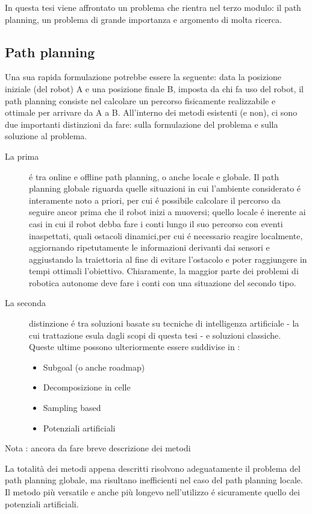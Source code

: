 \documentclass[14pt,twoside,a4paper]{extarticle}
\begin{document}
In questa tesi viene affrontato un problema che rientra nel terzo modulo: il path planning, un problema di grande importanza e argomento di molta ricerca.

\subsection{Path planning}

Una sua rapida formulazione potrebbe essere la seguente: data la posizione iniziale (del robot) A e una posizione finale B, imposta da chi fa uso del robot, il path planning consiste nel calcolare un percorso fisicamente realizzabile e ottimale per arrivare da A a B.
All'interno dei metodi esistenti (e non), ci sono due importanti distinzioni da fare: sulla formulazione del problema e sulla soluzione al problema.
\begin{description}
\item[La prima] é tra online e offline path planning, o anche locale e globale. Il path planning globale riguarda quelle situazioni in cui l'ambiente considerato é interamente noto a priori, per cui é possibile calcolare il percorso da seguire ancor prima che il robot inizi a muoversi; quello locale é inerente ai casi in cui il robot debba fare i conti lungo il suo percorso con eventi inaspettati, quali ostacoli dinamici,per cui é necessario reagire localmente, aggiornando ripetutamente le informazioni derivanti dai sensori e aggiustando la traiettoria al fine di evitare l'ostacolo e poter raggiungere in tempi ottimali l'obiettivo. Chiaramente, la maggior parte dei problemi di robotica autonome deve fare i conti con una situazione del secondo tipo. 
\item[La seconda] distinzione é tra soluzioni basate su tecniche di intelligenza artificiale - la cui trattazione esula dagli scopi di questa tesi - e soluzioni classiche. Queste ultime possono ulteriormente essere suddivise in \cite{siciliano}:
\begin{itemize}
\item{Subgoal (o anche roadmap)}
\item{Decomposizione in celle}
\item{Sampling based}
\item{Potenziali artificiali}
\end{itemize}
\end{description}

Nota : ancora da fare breve descrizione dei metodi

La totalità dei metodi appena descritti risolvono adeguatamente il problema del path planning globale\cite{dalfonso}, ma risultano inefficienti nel caso del path planning locale. Il metodo più versatile e anche più longevo nell'utilizzo é sicuramente quello dei potenziali artificiali. 
\end{document}
